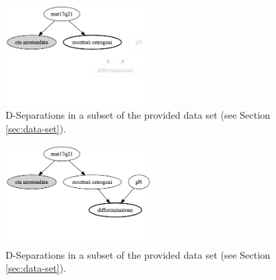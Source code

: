 \begin{figure}[htbp]
\centerline{\includegraphics[width=0.5\textwidth]{mathematical-background/images/bn-example-separations-2}}
\caption{D-Separations in a subset of the provided data set (see Section \ref{sec:data-set}).}
\label{fig:bn-separations-example-2}
\end{figure}

\begin{figure}[htbp]
\centerline{\includegraphics[width=0.5\textwidth]{mathematical-background/images/bn-example-separations-3}}
\caption{D-Separations in a subset of the provided data set (see Section \ref{sec:data-set}).}
\label{fig:bn-separations-example-3}
\end{figure}

